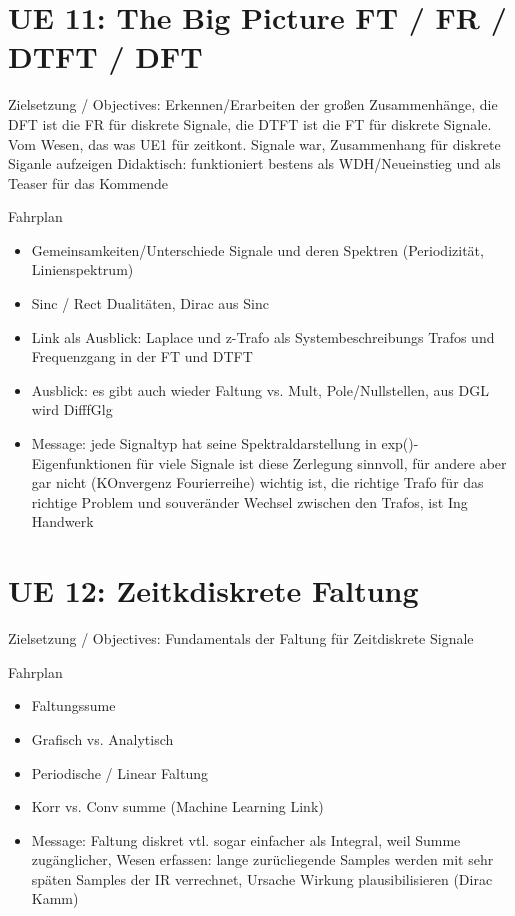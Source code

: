 \newpage
\section{UE 11: The Big Picture FT / FR / DTFT / DFT}
Zielsetzung / Objectives: Erkennen/Erarbeiten der großen Zusammenhänge,
die DFT ist die FR für diskrete Signale, die DTFT ist die FT für diskrete Signale.
Vom Wesen, das was UE1 für zeitkont. Signale war, Zusammenhang für diskrete Siganle aufzeigen
Didaktisch: funktioniert bestens als WDH/Neueinstieg und als Teaser für das Kommende

Fahrplan
\begin{itemize}
\item Gemeinsamkeiten/Unterschiede Signale und deren Spektren (Periodizität, Linienspektrum)
\item Sinc / Rect Dualitäten, Dirac aus Sinc
\item Link als Ausblick: Laplace und z-Trafo als Systembeschreibungs Trafos und Frequenzgang in der FT und DTFT
\item Ausblick: es gibt auch wieder Faltung vs. Mult, Pole/Nullstellen, aus DGL wird DifffGlg
\item Message: jede Signaltyp hat seine Spektraldarstellung in exp()-Eigenfunktionen
für viele Signale ist diese Zerlegung sinnvoll, für andere aber gar nicht (KOnvergenz Fourierreihe)
wichtig ist, die richtige Trafo für das richtige Problem und souveränder Wechsel zwischen den Trafos, ist
Ing Handwerk
\end{itemize}

\newpage
\section{UE 12: Zeitkdiskrete Faltung}
Zielsetzung / Objectives: Fundamentals der Faltung für Zeitdiskrete Signale

Fahrplan
\begin{itemize}
\item Faltungssume
\item Grafisch vs. Analytisch
\item Periodische / Linear Faltung
\item Korr vs. Conv summe (Machine Learning Link)
\item Message: Faltung diskret vtl. sogar einfacher als Integral, weil Summe
zugänglicher, Wesen erfassen: lange zurücliegende Samples werden mit sehr späten Samples der IR verrechnet, Ursache Wirkung plausibilisieren (Dirac Kamm)
\end{itemize}

